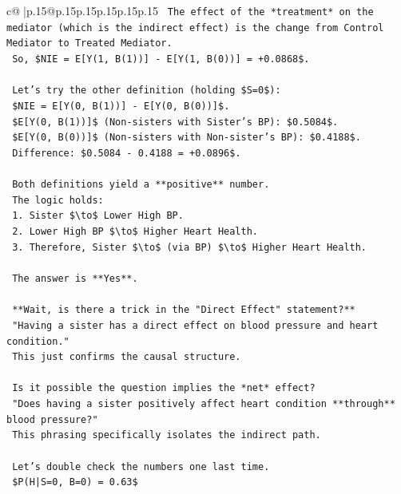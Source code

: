 \documentclass{article}
\begin{document}
{\begin{supertabular}{c@{$\;$}|p{.15\linewidth}@{}p{.15\linewidth}p{.15\linewidth}p{.15\linewidth}p{.15\linewidth}p{.15\linewidth}}
{{{\texttt{    The effect of the *treatment* on the mediator (which is the indirect effect) is the change from Control Mediator to Treated Mediator.} \\
\texttt{    So, \$NIE = E{[}Y(1, B(1)){]} {-} E{[}Y(1, B(0)){]} = +0.0868\$.} \\
\\ 
\texttt{    Let's try the other definition (holding \$S=0\$):} \\
\texttt{    \$NIE = E{[}Y(0, B(1)){]} {-} E{[}Y(0, B(0)){]}\$.} \\
\texttt{    \$E{[}Y(0, B(1)){]}\$ (Non{-}sisters with Sister's BP): \$0.5084\$.} \\
\texttt{    \$E{[}Y(0, B(0)){]}\$ (Non{-}sisters with Non{-}sister's BP): \$0.4188\$.} \\
\texttt{    Difference: \$0.5084 {-} 0.4188 = +0.0896\$.} \\
\\ 
\texttt{    Both definitions yield a **positive** number.} \\
\texttt{    The logic holds:} \\
\texttt{    1. Sister \$\textbackslash{}to\$ Lower High BP.} \\
\texttt{    2. Lower High BP \$\textbackslash{}to\$ Higher Heart Health.} \\
\texttt{    3. Therefore, Sister \$\textbackslash{}to\$ (via BP) \$\textbackslash{}to\$ Higher Heart Health.} \\
\\ 
\texttt{    The answer is **Yes**.} \\
\\ 
\texttt{    **Wait, is there a trick in the "Direct Effect" statement?**} \\
\texttt{    "Having a sister has a direct effect on blood pressure and heart condition."} \\
\texttt{    This just confirms the causal structure.} \\
\\ 
\texttt{    Is it possible the question implies the *net* effect?} \\
\texttt{    "Does having a sister positively affect heart condition **through** blood pressure?"} \\
\texttt{    This phrasing specifically isolates the indirect path.} \\
\\ 
\texttt{    Let's double check the numbers one last time.} \\
\texttt{    \$P(H|S=0, B=0) = 0.63\$} \\
}}}
\end{supertabular}}
\end{document}

